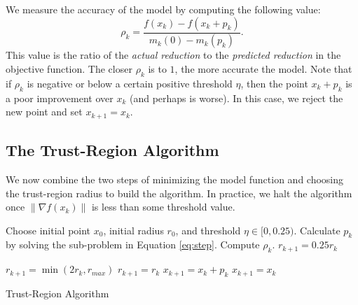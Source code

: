 We measure the accuracy of the model by computing the following value:
\[
\rho_k = \frac{f(x_k)-f(x_k+p_k)}{m_k(0) - m_k(p_k)}.
\]
This value is the ratio of the \emph{actual reduction} to the \emph{predicted reduction} in the objective function. The closer
$\rho_k$ is to $1$, the more accurate the model.
Note that if $\rho_k$ is negative or below a certain positive threshold $\eta$,
then the point $x_k+p_k$ is a poor improvement over $x_k$ (and perhaps is worse).
In this case, we reject the new point and set $x_{k+1} = x_k$.

\subsection*{The Trust-Region Algorithm}
We now combine the two steps of minimizing the model function and choosing the trust-region radius to build the algorithm.
In practice, we halt the algorithm once $\|\nabla f(x_k)\|$ is less than some threshold value.
\begin{algorithm}
\begin{algorithmic}[1]
    \State Choose initial point $x_0$, initial radius $r_0$, and threshold $\eta \in [0,0.25)$.
        \State Calculate $p_k$ by solving the sub-problem in Equation \ref{eq:step}.
        \State Compute $\rho_k$.
            \State $r_{k+1} = 0.25r_k$

        \Else
                \State $r_{k+1} = \min(2r_k, r_{max})$
            \Else
                \State $r_{k+1} = r_k$
            \EndIf
        \EndIf
            \State $x_{k+1} = x_k + p_k$
        \Else
            \State $x_{k+1} = x_k$
        \EndIf
    \EndFor
\EndProcedure
\end{algorithmic}
\caption{Trust-Region Algorithm}
\label{alg:trustregion}
\end{algorithm}

